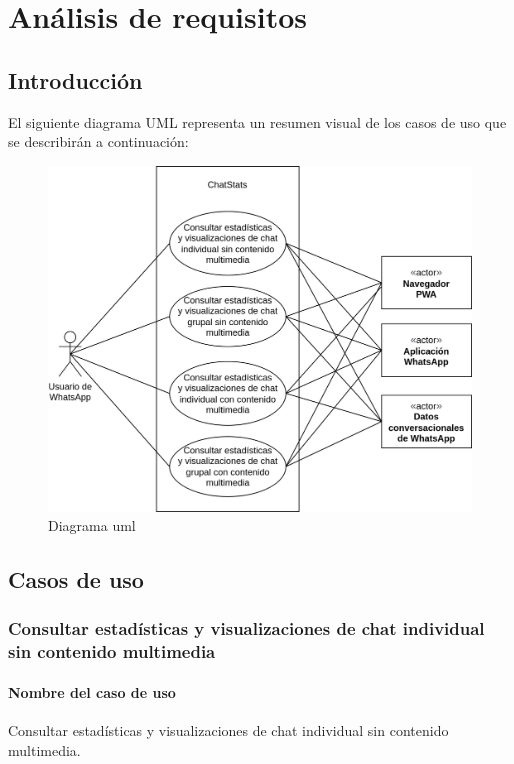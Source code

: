 \chapter{Análisis de requisitos}
\label{chap:use-case}

\section{Introducción}
\label{sec:introduction}

El siguiente diagrama UML representa un resumen visual de los casos de uso que se describirán a continuación: 

\begin{figure}[h]
	\centering
	\includegraphics[width=\textwidth]{img/uml.png}
	\caption{Diagrama \acrshort{uml}}
	\label{fig:chap3:uml}
\end{figure}

\section{Casos de uso}
\label{sec:use-cases}


\subsection{Consultar estadísticas y visualizaciones de chat individual sin contenido multimedia}

\subsubsection{Nombre del caso de uso} Consultar estadísticas y visualizaciones de chat individual sin contenido multimedia.

